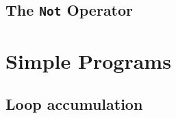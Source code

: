         
    
    \subsection{The \texttt{Not} Operator}\label{evaln:ops:not}
        
        
        

\newpage


\section{Simple Programs}\label{evaln:progs}
    \subsection{Loop accumulation}
        
